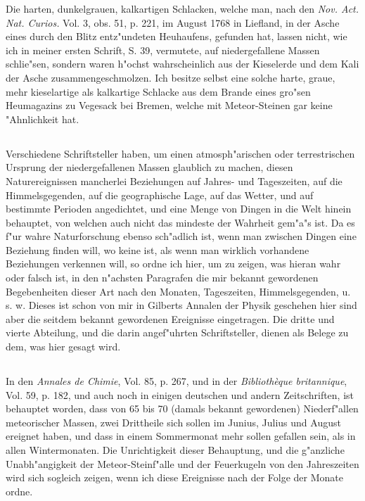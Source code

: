 \documentclass[a4paper, 11pt, oneside, polutonikogreek, german]{article}
\begin{document}
Die harten, dunkelgrauen, kalkartigen Schlacken, welche man, nach den \emph{Nov. Act. Nat. Curios.} Vol. 3, obs. 51, p. 221, im August 1768 in Liefland, in der Asche eines durch den Blitz entz"undeten Heuhaufens, gefunden hat, lassen nicht, wie ich in meiner ersten Schrift, S. 39, vermutete, auf niedergefallene Massen schlie"sen, sondern waren h"ochst wahrscheinlich aus der Kieselerde und dem Kali der Asche zusammengeschmolzen. Ich besitze selbst eine solche harte, graue, mehr kieselartige als kalkartige Schlacke aus dem Brande eines gro"sen Heumagazins zu Vegesack bei Bremen, welche mit Meteor-Steinen gar keine "Ahnlichkeit hat.
\subsection{}
\paragraph{}
Verschiedene Schriftsteller haben, um einen atmosph"arischen oder terrestrischen Ursprung der niedergefallenen Massen glaublich zu machen, diesen Naturereignissen mancherlei Beziehungen auf Jahres- und Tageszeiten, auf die Himmelsgegenden, auf die geographische Lage, auf das Wetter, und auf bestimmte Perioden angedichtet, und eine Menge von Dingen in die Welt hinein behauptet, von welchen auch nicht das mindeste der Wahrheit gem"a"s ist. Da es f"ur wahre Naturforschung ebenso sch"adlich ist, wenn man zwischen Dingen eine Beziehung finden will, wo keine ist, als wenn man wirklich vorhandene Beziehungen verkennen will, so ordne ich hier, um zu zeigen, was hieran wahr oder falsch ist, in den n"achsten Paragrafen die mir bekannt gewordenen Begebenheiten dieser Art nach den Monaten, Tageszeiten, Himmelsgegenden, u. s. w. Dieses ist schon von mir in Gilberts Annalen der Physik geschehen hier sind aber die seitdem bekannt gewordenen Ereignisse eingetragen. Die dritte und vierte Abteilung, und die darin angef"uhrten Schriftsteller, dienen als Belege zu dem, was hier gesagt wird.
\subsection{}
\paragraph{}
In den \emph{Annales de Chimie}, Vol. 85, p. 267, und in der \emph{Bibliothèque britannique}, Vol. 59, p. 182, und auch noch in einigen deutschen und andern Zeitschriften, ist behauptet worden, dass von 65 bis 70 (damals bekannt gewordenen) Niederf"allen meteorischer Massen, zwei Drittheile sich sollen im Junius, Julius und August ereignet haben, und dass in einem Sommermonat mehr sollen gefallen sein, als in allen Wintermonaten. Die Unrichtigkeit dieser Behauptung, und die g"anzliche Unabh"angigkeit der Meteor-Steinf"alle und der Feuerkugeln von den Jahreszeiten wird sich sogleich zeigen, wenn ich diese Ereignisse nach der Folge der Monate ordne.
\end{document}
